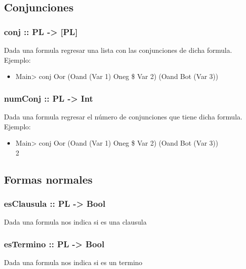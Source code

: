 \documentclass[11pt]{article}
\begin{document}
\subsection{Conjunciones}
\label{sec:orgb0abeed}
\subsubsection{conj :: PL -> [PL]}
\label{sec:org2d3ea08}
Dada una formula regresar una lista con las conjunciones de dicha formula.\\
Ejemplo: 
\begin{itemize}
\item Main> conj Oor (Oand (Var 1) Oneg \$ Var 2) (Oand Bot (Var 3))\\
[Oand (Var 1) Oneg \$ Var 2, Oand Bot (Var 3)]
\end{itemize}
\subsubsection{numConj :: PL -> Int}
\label{sec:org9b202e6}
Dada una formula regresar el número de conjunciones que tiene dicha formula.\\
Ejemplo:
\begin{itemize}
\item Main> conj Oor (Oand (Var 1) Oneg \$ Var 2) (Oand Bot (Var 3))\\
2
\end{itemize}
\subsection{Formas normales}
\label{sec:org7e15bbc}
\subsubsection{esClausula :: PL -> Bool}
\label{sec:orga80dd76}
Dada una formula nos indica si es una clausula
\subsubsection{esTermino :: PL -> Bool}
\label{sec:org7c07d32}
Dada una formula nos indica si es un termino
\end{document}
